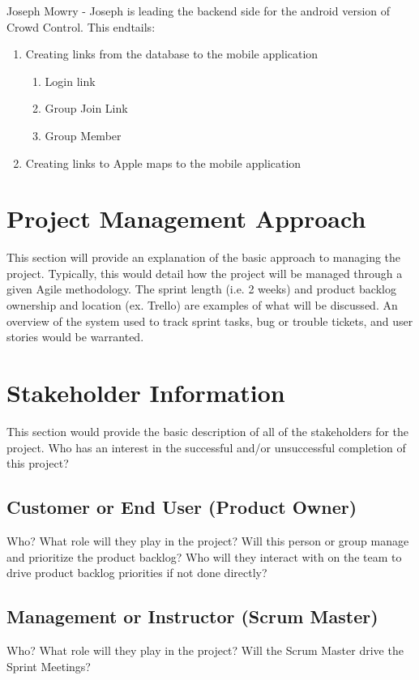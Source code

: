 Joseph Mowry - Joseph is leading the backend side for the android version of Crowd Control. This endtails:

	\begin{enumerate}
	\item Creating links from the database to the mobile application
		\begin{enumerate}
		\item Login link
		\item Group Join Link
		\item Group Member
		\end{enumerate}
	\item Creating links to Apple maps to the mobile application
	\end{enumerate}



\section{Project  Management Approach}
This section will provide an explanation of the basic approach to managing the 
project.  Typically, this would detail how the project will be managed through 
a given Agile methodology.  The sprint length (i.e. 2 weeks) and product backlog 
ownership and location (ex. Trello) are examples of what will be discussed.  An 
overview of the system used to track sprint tasks, bug or trouble tickets, and 
user stories would be warranted. 


\section{ Stakeholder Information}


This section would provide the basic description of all of the stakeholders for 
the project.  Who has an interest in the successful and/or unsuccessful completion 
of this project? 


\subsection{Customer or End User (Product Owner)}
Who?  What role will they play in the project?  Will this person or group manage 
and prioritize the product backlog?  Who will they interact with on the team to 
drive product backlog priorities if not done directly? 

\subsection{Management or Instructor (Scrum Master)}
Who?  What role will they play in the project?  Will the Scrum Master drive the 
Sprint Meetings? 


